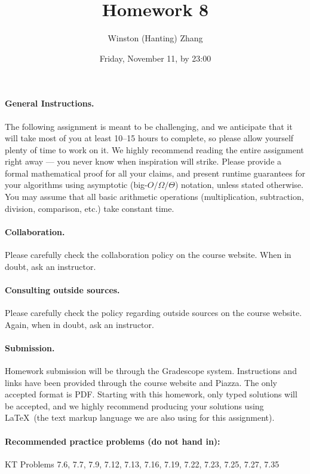 \documentclass[10pt]{article}
\title{\bf Homework 8}
\author{Winston (Hanting) Zhang}
\date{Friday, November 11, by 23:00}
\begin{document}
\maketitle

\paragraph{General Instructions.} The following assignment is meant to be challenging, and we anticipate that it will take most of you at least 10--15 hours to complete, so please allow yourself plenty of time to work on it.
We highly recommend reading the entire assignment right away --- you never know when inspiration will strike.
Please provide a formal mathematical proof for all your claims, and  present runtime guarantees for your algorithms using asymptotic (big-$O/\Omega/\Theta$) notation, unless stated otherwise. You may assume that all basic arithmetic operations (multiplication, subtraction, division, comparison, etc.) take constant time. %

\paragraph{Collaboration.}  Please carefully check the collaboration policy on the course website. When in doubt, ask an instructor.

\paragraph{Consulting outside sources.} Please carefully check the policy regarding outside sources on the course website. Again, when in doubt, ask an instructor.

\paragraph{Submission.} Homework submission will be through the Gradescope system. Instructions and links have been provided through the course website and Piazza. The only accepted format is PDF. Starting with this homework, only typed solutions will be accepted, and we highly recommend producing your solutions using \LaTeX~(the text markup language we are also using for this assignment).

\paragraph{Recommended practice problems (do not hand in):} KT Problems 7.6, 7.7, 7.9, 7.12, 7.13, 7.16, 7.19, 7.22, 7.23, 7.25, 7.27, 7.35
\end{document}
